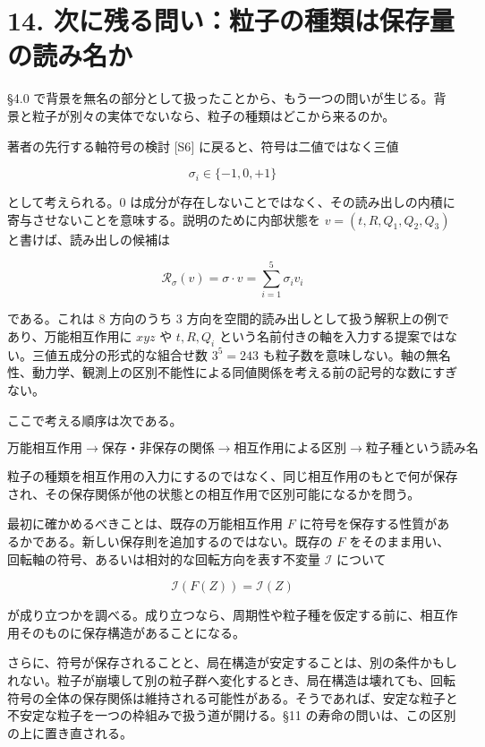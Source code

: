 \documentclass[
  a4paper,
]{ltjsarticle}
\begin{document}
\section{14.
次に残る問い：粒子の種類は保存量の読み名か}\label{ux6b21ux306bux6b8bux308bux554fux3044ux7c92ux5b50ux306eux7a2eux985eux306fux4fddux5b58ux91cfux306eux8aadux307fux540dux304b}

§4.0
で背景を無名の部分として扱ったことから、もう一つの問いが生じる。背景と粒子が別々の実体でないなら、粒子の種類はどこから来るのか。

著者の先行する軸符号の検討 {[}S6{]} に戻ると、符号は二値ではなく三値

\[
\sigma_i\in\{-1,0,+1\}
\]

として考えられる。\(0\)
は成分が存在しないことではなく、その読み出しの内積に寄与させないことを意味する。説明のために内部状態を
\(v=(t,R,Q_1,Q_2,Q_3)\) と書けば、読み出しの候補は

\[
\mathcal R_\sigma(v)=\sigma\cdot v=\sum_{i=1}^{5}\sigma_iv_i
\]

である。これは 8 方向のうち 3
方向を空間的読み出しとして扱う解釈上の例であり、万能相互作用に \(xyz\)
や \(t,R,Q_i\)
という名前付きの軸を入力する提案ではない。三値五成分の形式的な組合せ数
\(3^5=243\)
も粒子数を意味しない。軸の無名性、動力学、観測上の区別不能性による同値関係を考える前の記号的な数にすぎない。

ここで考える順序は次である。

\[
\boxed{
\text{万能相互作用}
\longrightarrow
\text{保存・非保存の関係}
\longrightarrow
\text{相互作用による区別}
\longrightarrow
\text{粒子種という読み名}
}
\]

粒子の種類を相互作用の入力にするのではなく、同じ相互作用のもとで何が保存され、その保存関係が他の状態との相互作用で区別可能になるかを問う。

最初に確かめるべきことは、既存の万能相互作用 \(F\)
に符号を保存する性質があるかである。新しい保存則を追加するのではない。既存の
\(F\) をそのまま用い、回転軸の符号、あるいは相対的な回転方向を表す不変量
\(\mathcal I\) について

\[
\boxed{\mathcal I(F(Z))=\mathcal I(Z)}
\]

が成り立つかを調べる。成り立つなら、周期性や粒子種を仮定する前に、相互作用そのものに保存構造があることになる。

さらに、符号が保存されることと、局在構造が安定することは、別の条件かもしれない。粒子が崩壊して別の粒子群へ変化するとき、局在構造は壊れても、回転符号の全体の保存関係は維持される可能性がある。そうであれば、安定な粒子と不安定な粒子を一つの枠組みで扱う道が開ける。§11
の寿命の問いは、この区別の上に置き直される。
\end{document}
